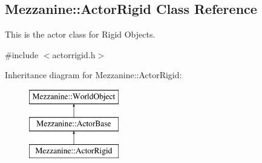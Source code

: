 \hypertarget{classMezzanine_1_1ActorRigid}{
\subsection{Mezzanine::ActorRigid Class Reference}
\label{classMezzanine_1_1ActorRigid}
}


This is the actor class for Rigid Objects.  




{\ttfamily \#include $<$actorrigid.h$>$}

Inheritance diagram for Mezzanine::ActorRigid:\begin{figure}[H]
\begin{center}
\leavevmode
\includegraphics[height=3.000000cm]{classMezzanine_1_1ActorRigid}
\end{center}
\end{figure}
